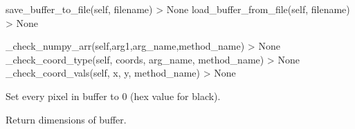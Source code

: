 \documentclass[letterpaper,10pt,english]{sphinxmanual}
\begin{document}
\begin{fulllineitems}
\begin{fulllineitems}
\end{fulllineitems}



\begin{fulllineitems}

\pysigstartsignatures
{}
\pysigstopsignatures
\sphinxAtStartPar
save\_buffer\_to\_file(self, filename) \sphinxhyphen{}\textgreater{} None
load\_buffer\_from\_file(self, filename) \sphinxhyphen{}\textgreater{} None

\end{fulllineitems}



\begin{fulllineitems}

\pysigstartsignatures
{}
\pysigstopsignatures
\sphinxAtStartPar
\_check\_numpy\_arr(self,arg1,arg\_name,method\_name) \sphinxhyphen{}\textgreater{} None
\_check\_coord\_type(self, coords, arg\_name, method\_name) \sphinxhyphen{}\textgreater{} None
\_check\_coord\_vals(self, x, y, method\_name) \sphinxhyphen{}\textgreater{} None

\end{fulllineitems}


\begin{fulllineitems}
\label{\detokenize{dpav:dpav.vbuffer.VBuffer.clear}}
\pysigstartsignatures
{}
\pysigstopsignatures
\sphinxAtStartPar
Set every pixel in buffer to 0 (hex value for black).

\end{fulllineitems}


\begin{fulllineitems}
\label{\detokenize{dpav:dpav.vbuffer.VBuffer.dimensions}}
\pysigstartsignatures
{}
\pysigstopsignatures
\sphinxAtStartPar
Return dimensions of buffer.

\end{fulllineitems}


\end{fulllineitems}
\end{document}
